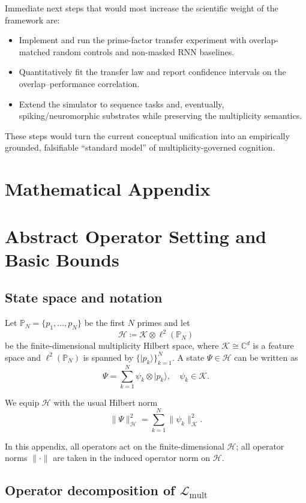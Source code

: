 \documentclass[11pt]{article}
\begin{document}
Immediate next steps that would most increase the scientific weight of the framework are:
\begin{itemize}[nosep]
\item Implement and run the prime-factor transfer experiment with overlap-matched random controls and non-masked RNN baselines.
\item Quantitatively fit the transfer law and report confidence intervals on the overlap--performance correlation.
\item Extend the simulator to sequence tasks and, eventually, spiking/neuromorphic substrates while preserving the multiplicity semantics.
\end{itemize}

These steps would turn the current conceptual unification into an empirically grounded, falsifiable ``standard model'' of multiplicity-governed cognition.

\appendix
\section*{Mathematical Appendix}

\section{Abstract Operator Setting and Basic Bounds}

\subsection{State space and notation}

Let \(\mathbb{P}_N = \{p_1,\dots,p_N\}\) be the first \(N\) primes and let
\[
\mathcal{H} \coloneqq \mathcal{K} \otimes \ell^2(\mathbb{P}_N)
\]
be the finite-dimensional multiplicity Hilbert space, where \(\mathcal{K} \cong \mathbb{C}^d\) is a feature space and \(\ell^2(\mathbb{P}_N)\) is spanned by \(\{\lvert p_k\rangle\}_{k=1}^N\). A state \(\Psi\in\mathcal{H}\) can be written as
\[
\Psi = \sum_{k=1}^N \psi_k \otimes \lvert p_k\rangle,
\quad \psi_k \in \mathcal{K}.
\]

We equip \(\mathcal{H}\) with the usual Hilbert norm
\[
\|\Psi\|_{\mathcal{H}}^2
=
\sum_{k=1}^N \|\psi_k\|_{\mathcal{K}}^2.
\]

In this appendix, all operators act on the finite-dimensional \(\mathcal{H}\); all operator norms \(\|\cdot\|\) are taken in the induced operator norm on \(\mathcal{H}\).

\subsection{Operator decomposition of \(\mathcal{L}_{\mathrm{mult}}\)}
\end{document}
